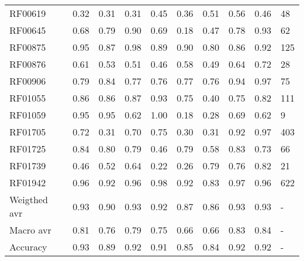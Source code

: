 \begin{tabular}{lrrrrrrrrl}
RF00619      &  0.32 &  0.31 &  0.31 &   0.45 &    0.36 &     0.51 &  0.56 & 0.46 &         48 \\
RF00645      &  0.68 &  0.79 &  0.90 &   0.69 &    0.18 &     0.47 &  0.78 & 0.93 &         62 \\
RF00875      &  0.95 &  0.87 &  0.98 &   0.89 &    0.90 &     0.80 &  0.86 & 0.92 &        125 \\
RF00876      &  0.61 &  0.53 &  0.51 &   0.46 &    0.58 &     0.49 &  0.64 & 0.72 &         28 \\
RF00906      &  0.79 &  0.84 &  0.77 &   0.76 &    0.77 &     0.76 &  0.94 & 0.97 &         75 \\
RF01055      &  0.86 &  0.86 &  0.87 &   0.93 &    0.75 &     0.40 &  0.75 & 0.82 &        111 \\
RF01059      &  0.95 &  0.95 &  0.62 &   1.00 &    0.18 &     0.28 &  0.69 & 0.62 &          9 \\
RF01705      &  0.72 &  0.31 &  0.70 &   0.75 &    0.30 &     0.31 &  0.92 & 0.97 &        403 \\
RF01725      &  0.84 &  0.80 &  0.79 &   0.46 &    0.79 &     0.58 &  0.83 & 0.73 &         66 \\
RF01739      &  0.46 &  0.52 &  0.64 &   0.22 &    0.26 &     0.79 &  0.76 & 0.82 &         21 \\
RF01942      &  0.96 &  0.92 &  0.96 &   0.98 &    0.92 &     0.83 &  0.97 & 0.96 &        622 \\
Weigthed avr &  0.93 &  0.90 &  0.93 &   0.92 &    0.87 &     0.86 &  0.93 & 0.93 &          - \\
Macro avr    &  0.81 &  0.76 &  0.79 &   0.75 &    0.66 &     0.66 &  0.83 & 0.84 &          - \\
Accuracy     &  0.93 &  0.89 &  0.92 &   0.91 &    0.85 &     0.84 &  0.92 & 0.92 &          - \\
\bottomrule
\end{tabular}
